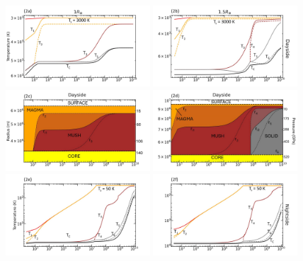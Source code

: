 \documentclass[fleqn,usenatbib]{mnras}
\begin{document}
\begin{figure}\centering
\includegraphics[width=0.48\textwidth]{2a.jpg}
\includegraphics[width=0.48\textwidth]{2b.jpg}
\includegraphics[width=0.48\textwidth]{2c.jpg}
\includegraphics[width=0.48\textwidth]{2d.jpg}
\includegraphics[width=0.48\textwidth]{2e.jpg}
\includegraphics[width=0.48\textwidth]{2f.jpg}

\end{figure}
\end{document}
